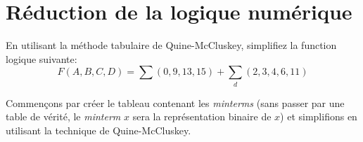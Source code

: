 \documentclass[12pt]{article}
\begin{document}



\section{Réduction de la logique numérique}
En utilisant la méthode tabulaire de Quine-McCluskey, simplifiez la function logique suivante:
\begin{equation*}
	F(A,B,C,D) = \sum(0,9,13,15) + \sum_d(2,3,4,6,11)
\end{equation*}

Commençons par créer le tableau contenant les \textsl{minterms} (sans passer par une table de vérité, le
\textsl{minterm} $x$ sera la représentation binaire de $x$) et simplifions en utilisant la technique de Quine-McCluskey.
\end{document}
